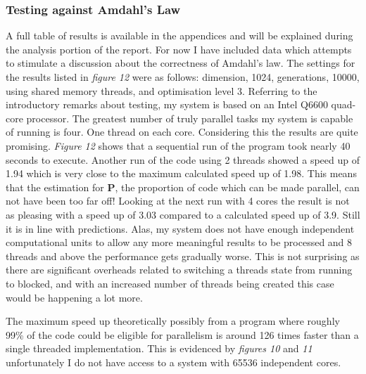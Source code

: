 \documentclass[11pt]{article} %
\begin{document}
\subsubsection{Testing against Amdahl's Law}
A full table of results is available in the appendices and will be explained during the analysis portion of the report. For now I have included data which attempts to stimulate a discussion about the correctness of Amdahl's law. The settings for the results listed in {\it figure 12} were as follows: dimension, 1024, generations, 10000, using shared memory threads, and optimisation level 3. Referring to the introductory remarks about testing, my system is based on an Intel Q6600 quad-core processor. The greatest number of truly parallel tasks my system is capable of running is four. One thread on each core. Considering this the results are quite promising. {\it Figure 12} shows that a sequential run of the program took nearly 40 seconds to execute. Another run of the code using 2 threads showed a speed up of 1.94 which is very close to the maximum calculated speed up of 1.98. This means that the estimation for {\bf P}, the proportion of code which can be made parallel, can not have been too far off! Looking at the next run with 4 cores the result is not as pleasing with a speed up of 3.03 compared to a calculated speed up of 3.9. Still it is in line with predictions. Alas, my system does not have enough independent computational units to allow any more meaningful results to be processed and 8 threads and above the performance gets gradually worse. This is not surprising as there are significant overheads related to switching a threads state from running to blocked, and with an increased number of threads being created this case would be happening a lot more.

The maximum speed up theoretically possibly from a program where roughly 99\% of the code could be eligible for parallelism is around 126 times faster than a single threaded implementation. This is evidenced by {\it figures 10} and {\it 11} unfortunately I do not have access to a system with 65536 independent cores.
\end{document}
